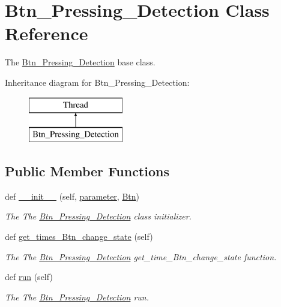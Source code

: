 \hypertarget{a00029}{}\section{Btn\+\_\+\+Pressing\+\_\+\+Detection Class Reference}
\label{a00029}


The \hyperlink{a00029}{Btn\+\_\+\+Pressing\+\_\+\+Detection} base class.  


Inheritance diagram for Btn\+\_\+\+Pressing\+\_\+\+Detection\+:\begin{figure}[H]
\begin{center}
\leavevmode
\includegraphics[height=2.000000cm]{a00029}
\end{center}
\end{figure}
\subsection*{Public Member Functions}
\begin{DoxyCompactItemize}
\item 
def \hyperlink{a00029_ab81832d78db80da2cf38fa604fe38edb}{\+\_\+\+\_\+init\+\_\+\+\_\+} (self, \hyperlink{a00029_a0d71b5c1dcca8d3fee88d6a11d3e2071}{parameter}, \hyperlink{a00029_a921d77252b5d9e078d906e8c2b745b49}{Btn})
\begin{DoxyCompactList}\small\item\em The The \hyperlink{a00029}{Btn\+\_\+\+Pressing\+\_\+\+Detection} class initializer. \end{DoxyCompactList}\item 
def \hyperlink{a00029_a939c51dd418f370caad2689fb0d438b6}{get\+\_\+times\+\_\+\+Btn\+\_\+change\+\_\+state} (self)
\begin{DoxyCompactList}\small\item\em The The \hyperlink{a00029}{Btn\+\_\+\+Pressing\+\_\+\+Detection} get\+\_\+time\+\_\+\+Btn\+\_\+change\+\_\+state function. \end{DoxyCompactList}\item 
def \hyperlink{a00029_ad22709b2e67308af35f55680d5a026e0}{run} (self)
\begin{DoxyCompactList}\small\item\em The The \hyperlink{a00029}{Btn\+\_\+\+Pressing\+\_\+\+Detection} run. \end{DoxyCompactList}\end{DoxyCompactItemize}
